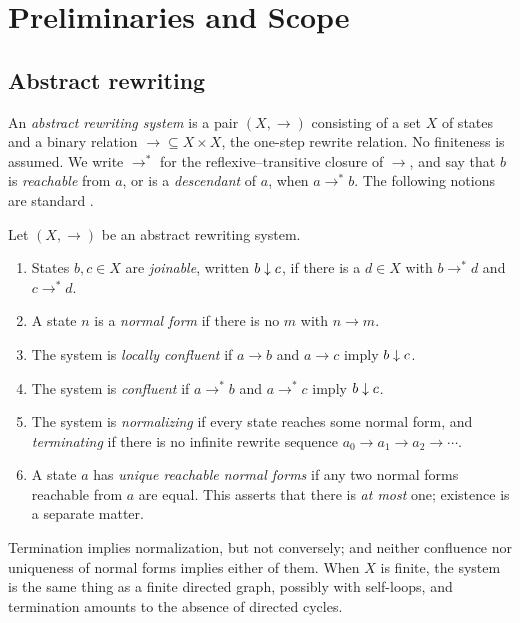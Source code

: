 \section{Preliminaries and Scope}
\label{sec:preliminaries-scope}

\subsection{Abstract rewriting}
\label{subsec:abstract-rewriting}

An \emph{abstract rewriting system} is a pair $(X,\to)$ consisting of a set $X$ of states and a binary relation ${\to} \subseteq X \times X$, the one-step rewrite relation. No finiteness is assumed. We write $\to^{*}$ for the reflexive--transitive closure of $\to$, and say that $b$ is \emph{reachable} from $a$, or is a \emph{descendant} of $a$, when $a \to^{*} b$. The following notions are standard \cite{BaaderNipkow1998,Huet1980,Terese2003}.

\begin{definition}
\label{def:basic-notions}
Let $(X,\to)$ be an abstract rewriting system.
\begin{enumerate}
    \item States $b,c \in X$ are \emph{joinable}, written $b \mathrel{\downarrow} c$, if there is a $d \in X$ with $b \to^{*} d$ and $c \to^{*} d$.
    \item A state $n$ is a \emph{normal form} if there is no $m$ with $n \to m$.
    \item The system is \emph{locally confluent} if $a \to b$ and $a \to c$ imply $b \mathrel{\downarrow} c$.
    \item The system is \emph{confluent} if $a \to^{*} b$ and $a \to^{*} c$ imply $b \mathrel{\downarrow} c$.
    \item The system is \emph{normalizing} if every state reaches some normal form, and \emph{terminating} if there is no infinite rewrite sequence $a_0 \to a_1 \to a_2 \to \cdots$.
    \item A state $a$ has \emph{unique reachable normal forms} if any two normal forms reachable from $a$ are equal. This asserts that there is \emph{at most} one; existence is a separate matter.
\end{enumerate}
\end{definition}

Termination implies normalization, but not conversely; and neither confluence nor uniqueness of normal forms implies either of them. When $X$ is finite, the system is the same thing as a finite directed graph, possibly with self-loops, and termination amounts to the absence of directed cycles.

